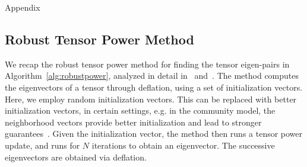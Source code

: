 \clearpage
\newpage

\onecolumn

\begin{center}
{\Large Appendix}
\end{center}

\subsection{Robust Tensor Power Method}
We recap the robust tensor power method for finding the tensor eigen-pairs in Algorithm~\ref{alg:robustpower}, analyzed in detail in~\cite{AnandkumarEtal:community12} and~\cite{AnandkumarEtal:tensor12}.
The method computes the eigenvectors of a   tensor through deflation, using a set of initialization vectors. Here, we employ random initialization vectors. This can be replaced with better initialization vectors, in certain settings, e.g. in the community model, the neighborhood vectors provide better initialization and lead to stronger guarantees~\cite{AnandkumarEtal:community12}.
Given the initialization vector, the method then runs a tensor power update, and runs for $N$ iterations to obtain an eigenvector. The successive eigenvectors are obtained via deflation.

